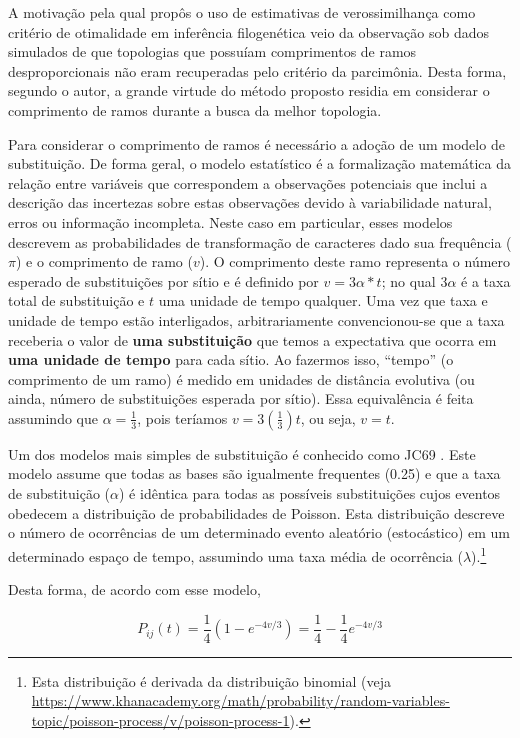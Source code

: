 \begin{refsection}
A motivação pela qual \textcite{Felsenstein_1978} propôs o uso de estimativas de verossimilhança como critério de otimalidade em inferência filogenética veio da observação sob dados simulados de que topologias que possuíam comprimentos de ramos desproporcionais não eram recuperadas pelo critério da parcimônia. Desta forma, segundo o autor, a grande virtude do método proposto residia em considerar o comprimento de ramos durante a busca da melhor topologia.

Para considerar o comprimento de ramos é necessário a adoção de um modelo de substituição. De forma geral, o modelo estatístico é a formalização matemática da relação entre variáveis que correspondem a observações potenciais que inclui a descrição das incertezas sobre estas observações devido à variabilidade natural, erros ou informação incompleta. Neste caso em particular, esses modelos descrevem as probabilidades de transformação de caracteres dado sua frequência ($\pi$) e o comprimento de ramo ($v$). O comprimento deste ramo representa o número esperado de substituições por sítio e é definido por $v=3\alpha * t$; no qual $3\alpha$ é a taxa total de substituição e $t$ uma unidade de tempo qualquer. Uma vez que taxa e unidade de tempo estão interligados, arbitrariamente convencionou-se que a taxa receberia o valor de \textbf{uma substituição} que temos a expectativa que ocorra em \textbf{uma unidade de tempo} para cada sítio. Ao fazermos isso, ``tempo'' (o comprimento de um ramo) é medido em unidades de distância evolutiva (ou ainda, número de substituições esperada por sítio). Essa equivalência é feita assumindo que $\alpha = \frac{1}{3}$, pois teríamos $v = 3(\frac{1}{3})t$, ou seja, $v = t$.

Um dos modelos mais simples de substituição é conhecido como JC69 \parencite[][]{Jukes_and_Cantor_1969}. Este modelo assume que todas as bases são igualmente frequentes (0.25) e que a taxa de substituição ($\alpha$) é idêntica para todas as possíveis substituições cujos eventos obedecem a distribuição de probabilidades de Poisson. Esta distribuição descreve o número de ocorrências de um determinado evento aleatório (estocástico) em um determinado espaço de tempo, assumindo uma taxa média de ocorrência ($\lambda$).\footnote{Esta distribuição é derivada da distribuição binomial (veja \url{https://www.khanacademy.org/math/probability/random-variables-topic/poisson-process/v/poisson-process-1}).} 


 Desta forma, de acordo com esse modelo,

\begin{center}
\begin{equation}
P_{ij}(t) = \frac{1}{4}(1-e^{-4v/3}) = \frac{1}{4}-\frac{1}{4}e^{-4v/3}
\end{equation}
\end{center}


\end{refsection}
